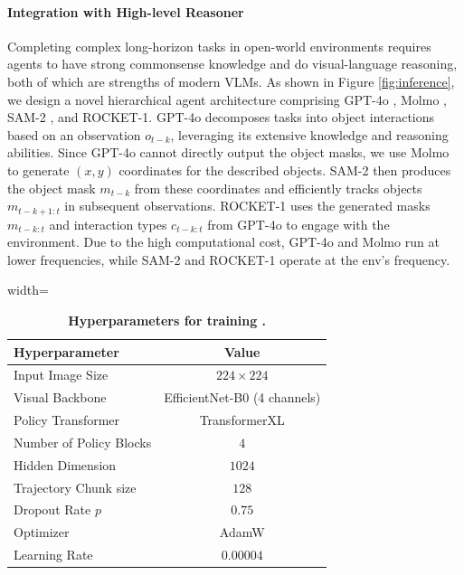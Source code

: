 \documentclass[11pt, a4paper, logo, two column]{craftjarvis}
\begin{document}
\paragraph{Integration with High-level Reasoner} 
Completing complex long-horizon tasks in open-world environments requires agents to have strong commonsense knowledge and do visual-language reasoning, both of which are strengths of modern VLMs. As shown in Figure \ref{fig:inference}, we design a novel hierarchical agent architecture comprising GPT-4o \citep{gpt4}, Molmo \citep{molmo}, SAM-2 \citep{sam2}, and ROCKET-1. GPT-4o decomposes tasks into object interactions based on an observation $o_{t-k}$, leveraging its extensive knowledge and reasoning abilities. Since GPT-4o cannot directly output the object masks, we use Molmo to generate $(x, y)$ coordinates for the described objects. SAM-2 then produces the object mask $m_{t-k}$ from these coordinates and efficiently tracks objects $m_{t-k+1:t}$ in subsequent observations. ROCKET-1 uses the generated masks $m_{t-k:t}$ and interaction types $c_{t-k:t}$ from GPT-4o to engage with the environment. Due to the high computational cost, GPT-4o and Molmo run at lower frequencies, while SAM-2 and ROCKET-1 operate at the env’s frequency. 

\begin{table}[t]
\small
\centering
\renewcommand{\arraystretch}{1.1}
\caption{
\textbf{Hyperparameters for training \agent.} 
} \label{table:implementation}
\begin{adjustbox}{width=\linewidth}
\begin{tabular}{@{}lc@{}}
\toprule
\textbf{Hyperparameter}  & \textbf{Value}   \\ \midrule
Input Image Size         & $224 \times 224$ \\
Visual Backbone          & EfficientNet-B0 (4 channels)  \\
Policy Transformer       & TransformerXL \\
Number of Policy Blocks  & $4$         \\
Hidden Dimension         & $1024$      \\
Trajectory Chunk size    & $128$       \\
Dropout Rate $p$         & $0.75$      \\
Optimizer                & AdamW       \\
Learning Rate            & $0.00004$   \\
\bottomrule
\end{tabular}
\end{adjustbox}
\end{table}
\end{document}

